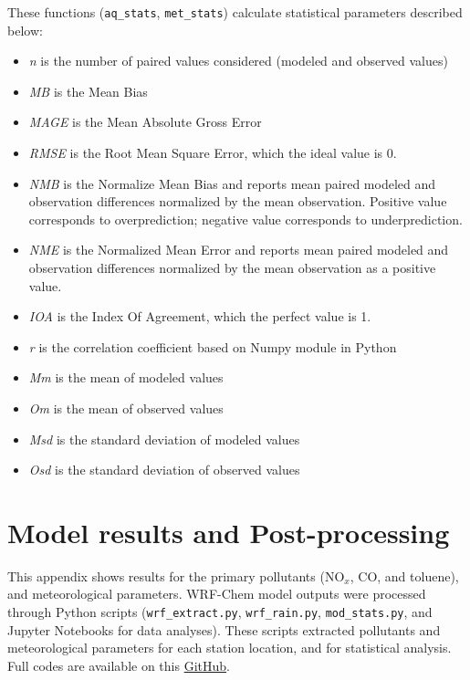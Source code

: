   These functions (\verb|aq_stats|, \verb|met_stats|) calculate statistical parameters described below:
  
  \begin{itemize}
  	\item \textit{n} is the number of paired values considered (modeled and observed values)
  	\item \textit{MB} is the Mean Bias
  	\item \textit{MAGE} is the Mean Absolute Gross Error
  	\item \textit{RMSE} is the Root Mean Square Error, which the ideal value is 0.
  	\item \textit{NMB} is the Normalize Mean Bias and reports mean paired modeled and observation differences normalized by the mean observation. Positive value corresponds to overprediction; negative value corresponds to underprediction.
  	\item \textit{NME} is the Normalized Mean Error and reports mean paired modeled and observation differences normalized by the mean observation as a positive value.
  	\item \textit{IOA} is the Index Of Agreement, which the perfect value is 1.
  	\item \textit{r} is the correlation coefficient based on Numpy module in Python
  	\item \textit{Mm} is the mean of modeled values
  	\item \textit{Om} is the mean of observed values
  	\item \textit{Msd} is the standard deviation of modeled values
  	\item \textit{Osd} is the standard deviation of observed values
  \end{itemize}
  
  \chapter{Model results and Post-processing}\label{ap:res}
  This appendix shows results for the primary pollutants (NO$_x$, CO, and toluene), and meteorological parameters.
  WRF-Chem model outputs were processed through Python scripts (\verb|wrf_extract.py|, \verb|wrf_rain.py|, \verb|mod_stats.py|, and Jupyter Notebooks for data analyses).
  These scripts extracted pollutants and meteorological parameters for each station location, and for statistical analysis.
  Full codes are available on this \href{https://github.com/adelgadop/PythonWRF}{GitHub}.
  
